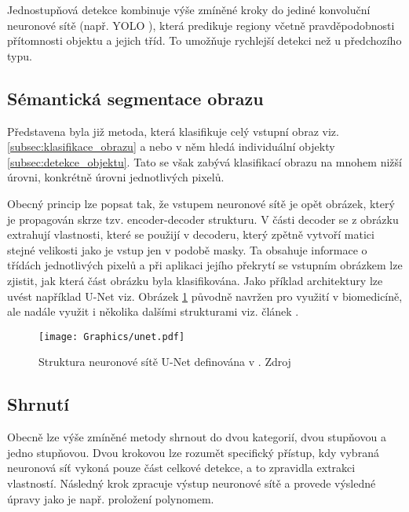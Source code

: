 \documentclass[czech, bc, kky, he, iso690numb]{fasthesis}
\begin{document}
           		Jednostupňová detekce kombinuje výše zmíněné kroky do jediné konvoluční neuronové sítě (např. YOLO \cite{YOLO}), která predikuje regiony včetně pravděpodobnosti přítomnosti objektu a jejich tříd. To umožňuje rychlejší detekci než u předchozího typu.
           	
           	\subsection{Sémantická segmentace obrazu}
            	Představena byla již metoda, která klasifikuje celý vstupní obraz viz. \ref{subsec:klasifikace_obrazu} a nebo v něm hledá individuální objekty \ref{subsec:detekce_objektu}. Tato se však zabývá klasifikací obrazu na mnohem nižší úrovni, konkrétně úrovni jednotlivých pixelů.
            	
            	Obecný princip lze popsat tak, že vstupem neuronové sítě je opět obrázek, který je propagován skrze tzv. encoder-decoder strukturu. V části decoder se z obrázku extrahují vlastnosti, které se použijí v decoderu, který zpětně vytvoří matici stejné velikosti jako je vstup jen v podobě masky. Ta obsahuje informace o třídách jednotlivých pixelů a při aplikaci jejího překrytí se vstupním obrázkem lze zjistit, jak která část obrázku byla klasifikována. Jako příklad architektury lze uvést například U-Net \cite{U-Net} viz. Obrázek \ref{pic:unet} původně navržen pro využití v biomedicíně, ale nadále využit i několika dalšími strukturami viz. článek \cite{semantic_segmentation_survey}.
            	
	            	\begin{figure}[h]
	            		\centering
	            		\texttt{[image: Graphics/unet.pdf]}
	            		\caption{Struktura neuronové sítě U-Net definována v \cite{U-Net}. Zdroj \cite{U-Net}}
	            		\label{pic:unet}
	            	\end{figure}
            	
            \subsection{Shrnutí}
            	Obecně lze výše zmíněné metody shrnout do dvou kategorií, dvou stupňovou a jedno stupňovou. Dvou krokovou lze rozumět specifický přístup, kdy vybraná neuronová síť vykoná pouze část celkové detekce, a to zpravidla extrakci vlastností. Následný krok zpracuje výstup neuronové sítě a provede výsledné úpravy jako je např. proložení polynomem.
            	
\end{document}
